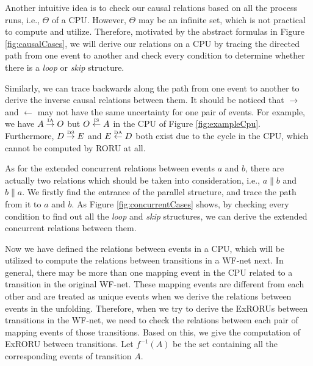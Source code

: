 \documentclass{llncs}
\begin{document}
Another intuitive idea is to check our causal relations based on all the process runs, i.e., $\Theta$ of a CPU. However, $\Theta$ may be an infinite set, which is not practical to compute and utilize. Therefore, motivated by the abstract formulas in Figure \ref{fig:causalCases}, we will derive our relations on a CPU by tracing the directed path from one event to another and check every condition to determine whether there is a \textit{loop} or \textit{skip} structure.

Similarly, we can trace backwards along the path from one event to another to derive the inverse causal relations between them. It should be noticed that $\rightarrow$ and $\leftarrow$ may not have the same uncertainty for one pair of events. For example, we have $A\overset{\text{\tiny{IA}}}{\rightarrow}O$ but $O\overset{\text{\tiny{IS}}}{\leftarrow}A$ in the CPU of Figure \ref{fig:exampleCpu}. Furthermore, $D\overset{\text{\tiny{DS}}}{\rightarrow}E$ and $E\overset{\text{\tiny{DA}}}{\leftarrow}D$ both exist due to the cycle in the CPU, which cannot be computed by RORU \cite{jin2014computing} at all.

As for the extended concurrent relations between events $a$ and $b$, there are actually two relations which should be taken into consideration, i.e., $a\parallel b$ and $b\parallel a$. We firstly find the entrance of the parallel structure, and trace the path from it to $a$ and $b$. As Figure \ref{fig:concurrentCases} shows, by checking every condition to find out all the \textit{loop} and \textit{skip} structures, we can derive the extended concurrent relations between them.

Now we have defined the relations between events in a CPU, which will be utilized to compute the relations between transitions in a WF-net next. In general, there may be more than one mapping event in the CPU related to a transition in the original WF-net. These mapping events are different from each other and are treated as unique events when we derive the relations between events in the unfolding. Therefore, when we try to derive the ExRORUs between transitions in the WF-net, we need to check the relations between each pair of mapping events of those transitions. Based on this, we give the computation of ExRORU between transitions. Let $f^{-1}(A)$ be the set containing all the corresponding events of transition $A$.
\end{document}
